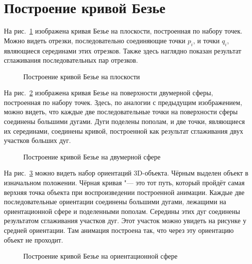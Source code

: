 \section{Построение кривой Безье}

На рис.~\ref{picture-bezier-plane} изображена кривая Безье на плоскости, построенная по набору точек. Можно видеть
отрезки, последовательно соединяющие точки $p_i$, и точки $q_i$, являющиеся серединами этих отрезков. Также здесь
наглядно показан результат сглаживания последовательных пар отрезков.

\begin{figure}[h!]
\caption{Построение кривой Безье на плоскости}
\label{picture-bezier-plane}
\end{figure}

На рис.~\ref{picture-bezier-two-dimension} изображена кривая Безье на поверхности двумерной сферы, построенная
по набору точек. Здесь, по аналогии с предыдущим изображением, можно видеть, что каждые две последовательные точки
на поверхности сферы соединены большими дугами. Дуги поделены пополам, и две точки, являющиеся их серединами,
соединены кривой, построенной как результат сглаживания двух участков больших дуг.

\begin{figure}[h!]
\caption{Построение кривой Безье на двумерной сфере}
\label{picture-bezier-two-dimension}
\end{figure}

На рис.~\ref{picture-bezier-orientation} можно видеть набор ориентаций 3D-объекта. Чёрным выделен объект
в изначальном положении. Чёрная кривая "--- это тот путь, который пройдёт самая верхняя точка объекта при
воспроизведении построенной анимации. Каждые две последовательные ориентации соединены большими дугами, лежащими
на ориентационной сфере и поделенными пополам. Середины этих дуг соединены результатом сглаживания участков дуг.
Этот участок можно увидеть на рисунке у средней ориентации. Там анимация построена так, что через эту ориентацию объект
не проходит.

\begin{figure}[t!]
\caption{Построение кривой Безье на ориентационной сфере}
\label{picture-bezier-orientation}
\end{figure}
